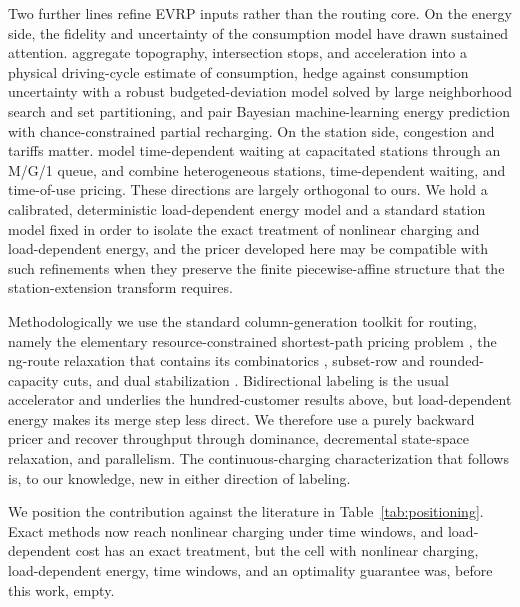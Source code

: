 \documentclass[review,3p,authoryear]{elsarticle}
\theoremstyle{plain}
\theoremstyle{definition}
\theoremstyle{remark}
\begin{document}
Two further lines refine EVRP inputs rather than the routing core. On the energy
side, the fidelity and uncertainty of the consumption
model have drawn sustained attention. \citet{basso2019energy} aggregate topography,
intersection stops, and acceleration into a physical driving-cycle estimate of
consumption, \citet{pelletier2019electric} hedge against consumption uncertainty
with a robust budgeted-deviation model solved by large neighborhood search and set
partitioning, and \citet{basso2021electric} pair Bayesian machine-learning energy
prediction with chance-constrained partial recharging. On the station side,
congestion and tariffs matter. \citet{keskin2019electric} model time-dependent
waiting at capacitated stations through an M/G/1 queue, and \citet{wang2026electric}
combine heterogeneous stations, time-dependent waiting, and time-of-use pricing.
These directions are largely orthogonal to ours. We hold a calibrated, deterministic
load-dependent energy model and a standard station model fixed in order to isolate
the exact treatment of nonlinear charging and load-dependent energy, and the pricer
developed here may be compatible with such refinements when they preserve the finite
piecewise-affine structure that the station-extension transform requires.

Methodologically we use the standard column-generation toolkit for routing, namely the
elementary resource-constrained shortest-path pricing problem
\citep{Feillet2004,IrnichDesaulniers2005}, the ng-route relaxation that contains
its combinatorics \citep{Baldacci2011}, subset-row
\citep{Jepsen2008,Pecin2017} and rounded-capacity
\citep{LysgaardLetchfordEglese2004} cuts, and dual stabilization
\citep{duMerle1999}. Bidirectional labeling \citep{RighiniSalani2006} is the
usual accelerator and underlies the hundred-customer results above, but
load-dependent energy makes its merge step less direct. We therefore use a purely
backward pricer and recover throughput through dominance, decremental state-space
relaxation, and parallelism. The continuous-charging characterization that follows
is, to our knowledge, new in either direction of labeling.

We position the contribution against the literature in Table~\ref{tab:positioning}.
Exact methods now reach nonlinear charging under time windows, and load-dependent
cost has an exact treatment, but the cell with nonlinear charging,
load-dependent energy, time windows, and an optimality guarantee was, before
this work, empty.
\end{document}
